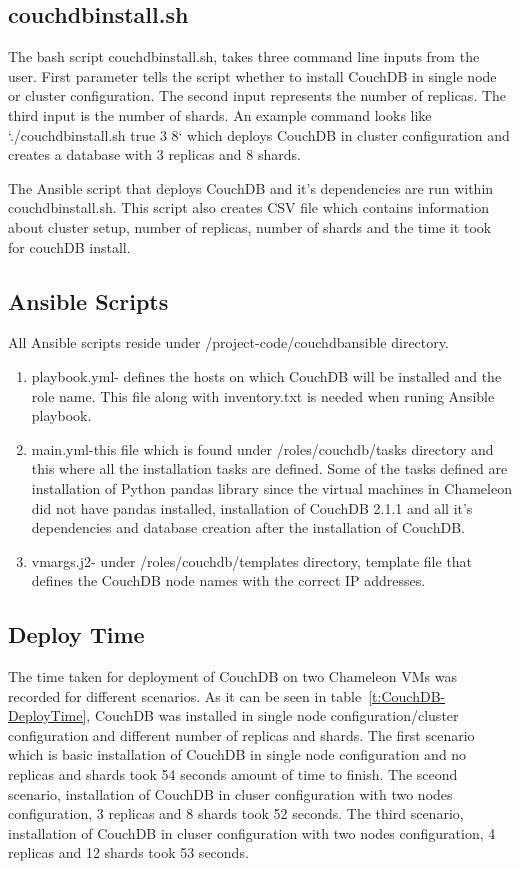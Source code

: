 \subsection{couchdbinstall.sh}

The bash script couchdbinstall.sh, takes three command line inputs
from the user. First parameter tells the script whether to install
CouchDB in single node or cluster configuration. The second input
represents the
number of replicas. The third input is the number of shards. An
example command looks like `./couchdbinstall.sh true 3 8` which
deploys CouchDB in cluster configuration and creates a database with 3
replicas and 8 shards.

The Ansible script that deploys CouchDB and it's dependencies are run
within couchdbinstall.sh. This script also creates CSV file which
contains information about cluster setup, number of replicas, number
of shards and the time it took for couchDB install.

\subsection{Ansible Scripts}
All Ansible scripts reside under /project-code/couchdbansible
directory. 
\begin{enumerate}
  \item playbook.yml- defines the hosts on which CouchDB will be
    installed and the role name. This file along with inventory.txt is
    needed when runing Ansible playbook.

  \item main.yml-this file which is found under /roles/couchdb/tasks
    directory and this where all the installation tasks are
    defined. Some of the tasks defined are installation of Python
    pandas library since the virtual machines in Chameleon did not have pandas
    installed, installation of CouchDB 2.1.1 and all it's dependencies
    and database creation after the installation of CouchDB.

  \item vmargs.j2- under /roles/couchdb/templates directory, template
    file that defines the CouchDB node names with the correct IP addresses.
\end{enumerate}

\subsection{Deploy Time}
The time taken for deployment of CouchDB on two Chameleon VMs was recorded for different
scenarios. As it can be seen in table~\ref{t:CouchDB-DeployTime},
CouchDB was installed in single node configuration/cluster configuration and different
number of replicas and shards. The first scenario which is basic installation of CouchDB
in single node configuration and no replicas and shards took 54 seconds
amount of time to finish. The sceond scenario, installation of CouchDB
in cluser configuration with two nodes configuration, 3 replicas and
8 shards took 52 seconds. The third scenario, installation of CouchDB
in cluser configuration with two nodes configuration, 4 replicas and
12 shards took 53 seconds. 

